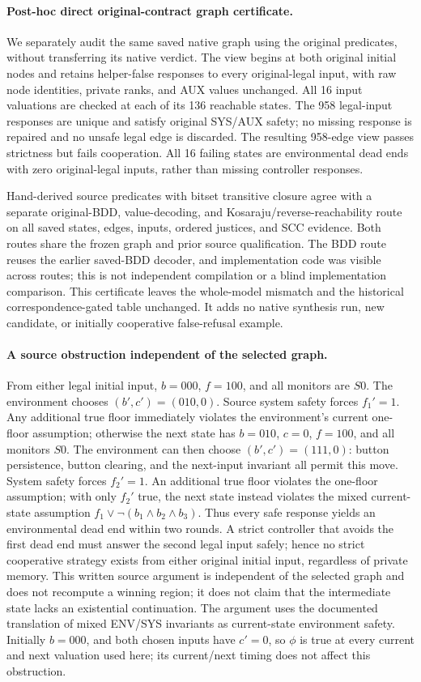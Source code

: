 \paragraph{Post-hoc direct original-contract graph certificate.}
We separately audit the same saved native graph using the original
predicates, without transferring its native verdict. The view begins at
both original initial nodes and retains helper-false responses to every
original-legal input, with raw node identities, private ranks, and AUX
values unchanged. All 16 input valuations are checked at each of its
136 reachable states. The 958 legal-input responses are unique and satisfy
original SYS/AUX safety; no missing response is repaired and no unsafe
legal edge is discarded. The resulting 958-edge view passes strictness
but fails cooperation. All 16 failing states are environmental dead ends
with zero original-legal inputs, rather than missing controller responses.

Hand-derived source predicates with bitset transitive closure agree with
a separate original-BDD, value-decoding, and Kosaraju/reverse-reachability
route on all saved states, edges, inputs, ordered justices, and SCC evidence.
Both routes share the frozen graph and prior source qualification.
The BDD route reuses the earlier saved-BDD decoder, and implementation
code was visible across routes; this is not independent compilation
or a blind implementation comparison.
This certificate leaves the whole-model mismatch and the historical
correspondence-gated table unchanged. It adds no native synthesis run,
new candidate, or initially cooperative false-refusal example.

\paragraph{A source obstruction independent of the selected graph.}
From either legal initial input, $b=000$, $f=100$, and all monitors are
$S0$. The environment chooses $(b',c')=(010,0)$.
Source system safety forces $f_1'=1$. Any additional true floor immediately
violates the environment's current one-floor assumption; otherwise the
next state has $b=010$, $c=0$, $f=100$, and all monitors $S0$.
The environment can then choose $(b',c')=(111,0)$: button persistence,
button clearing, and the next-input invariant all permit this move.
System safety forces $f_2'=1$. An additional true floor violates the
one-floor assumption; with only $f_2'$ true, the next state instead
violates the mixed current-state assumption
$f_1\lor\neg(b_1\land b_2\land b_3)$.
Thus every safe response yields an environmental dead end within two
rounds. A strict controller that avoids the first dead end must answer
the second legal input safely; hence no strict cooperative strategy
exists from either original initial input,
regardless of private memory. This written source argument is independent
of the selected graph and does not recompute a winning region; it does
not claim that the intermediate state lacks an existential continuation.
The argument uses the documented translation of mixed ENV/SYS invariants
as current-state environment safety. Initially $b=000$, and both chosen
inputs have $c'=0$, so $\phi$ is true at every current and next valuation
used here; its current/next timing does not affect this obstruction.
